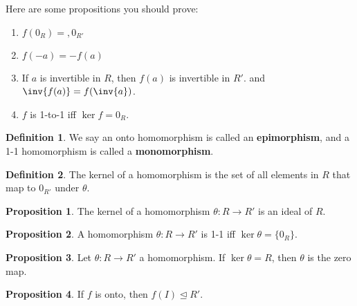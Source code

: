 \documentclass[a5paper]{article}
\theoremstyle{definition}%
\newtheorem*{proposition*}{Proposition}
\newtheorem*{definition*}{Definition}
\numberwithin{exercise}{section}
\theoremstyle{remark}%
\begin{document}
\begin{highlight}
Here are some propositions you should prove:
\begin{enumerate}
\item $f(0_R)=,0_{R'}$
\item $f(-a)=-f(a)$
\item If $a$ is invertible in $R$, then $f(a)$ is invertible in $R'$. and $\inv{f(a)}=f(\inv{a})$. 
\item $f$ is 1-to-1 iff $\ker f=0_R$. 
\end{enumerate}
\end{highlight}

\begin{highlight}
\begin{definition*}
We say an onto homomorphism is called an \textbf{epimorphism}, and a 1-1 homomorphism is called a \textbf{monomorphism}.
\end{definition*}
\end{highlight}

\begin{definition*}
The kernel of a homomorphism is the set of all elements in $R$ that map to $0_{R'}$ under $\theta$. 
\end{definition*}

\begin{highlight}
\begin{proposition*}
The kernel of a homomorphism $\theta:R\to R'$ is an ideal of $R$. 
\end{proposition*}
\end{highlight}

\begin{highlight}
\begin{proposition*}
A homomorphism $\theta:R\to R'$ is 1-1 iff $\ker\theta = \{0_R\}$.
\end{proposition*}
\end{highlight}

\begin{highlight}
\begin{proposition*}
Let $\theta:R\to R'$ a homomorphism. If $\ker \theta = R$, then $\theta$ is the zero map. 
\end{proposition*}
\end{highlight}

\begin{highlight}
\begin{proposition*}
If $f$ is onto, then $f(I)\trianglelefteq R'$. 
\end{proposition*}
\end{highlight}
\end{document}
